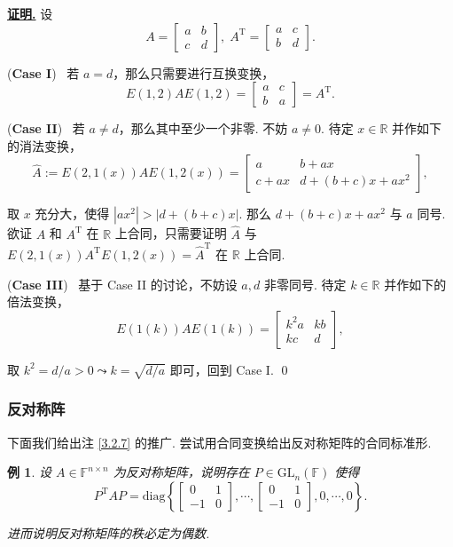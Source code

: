 \documentclass[10pt,openany]{article}
\theoremstyle{thmstyle} %
\theoremstyle{defstyle} %
\theoremstyle{prostyle} %
\theoremstyle{exastyle}
\newtheorem{example}[theorem]{例}
\theoremstyle{remstyle}
\renewenvironment{proof}[1][证明]{\par\underline{\textbf{#1.}} \;\fangsong}{\qed\par}
\newcommand{\T}{^{\text{T}}}
\newcommand{\F}{\mathbb{F}}
\newcommand{\gfn}{\text{GL}_n(\mathbb{F})}
\newcommand{\R}{\mathbb{R}}
\newcommand{\n}{^{n \times n}}
\newcommand{\diag}{\mathrm{diag}}
\begin{document}
\begin{proof}
	设
	\[ A=\begin{bmatrix}
		a & b \\ c & d
	\end{bmatrix}, \; A\T= \begin{bmatrix}
	a & c \\ b & d
	\end{bmatrix}. \]
	
	(\textbf{Case I}) \ 若 \( a=d \)，那么只需要进行互换变换，
	\[ E(1,2) AE(1,2)=\begin{bmatrix}
		a & c \\ b & a
	\end{bmatrix}=A\T. \]
	
	(\textbf{Case II}) \ 若 \( a \neq d \)，那么其中至少一个非零. 不妨 \( a \neq 0 \). 待定 \( x \in \R \) 并作如下的消法变换，
	\[ \hat{A}:=E(2,1(x))AE(1,2(x))= \begin{bmatrix}
		a & b+ax \\
		c+ax & d+(b+c)x+ax^2
	\end{bmatrix}, \]
	
	取 \( x \) 充分大，使得 \( |ax^2|>|d+(b+c)x| \). 那么 \( d+(b+c)x+ax^2 \) 与 \( a \) 同号. 欲证 \( A \) 和 \( A\T \) 在 \( \R \) 上合同，只需要证明 \( \hat{A} \) 与 \( E(2,1(x))A\T E(1,2(x))=\hat{A}\T \) 在 \( \R  \) 上合同.
	
	(\textbf{Case III}) \ 基于 Case II 的讨论，不妨设 \( a,d \) 非零同号. 待定 \( k \in \R \) 并作如下的倍法变换，
	\[ E(1(k))AE(1(k))=\begin{bmatrix}
		k^2a & kb \\
		kc & d
	\end{bmatrix}, \]
	
	取 \( k^2=d/a>0 \leadsto k=\sqrt{d/a} \) 即可，回到 Case I.
\end{proof}


\subsubsection{反对称阵}

下面我们给出注 \ref{3.2.7} 的推广. 尝试用合同变换给出反对称矩阵的合同标准形.

\begin{example} \label{3.4.7}
	设 \( A \in \F\n \) 为反对称矩阵，说明存在 \( P \in \gfn \) 使得
	\[ P\T AP= \diag\left\{ \begin{bmatrix}
		0 & 1 \\
		-1 & 0
	\end{bmatrix}, \cdots, \begin{bmatrix}
	0 & 1 \\
	-1 & 0
    \end{bmatrix}, 0,\cdots, 0 \right\}. \]

   进而说明反对称矩阵的秩必定为偶数.
\end{example}
\end{document}
